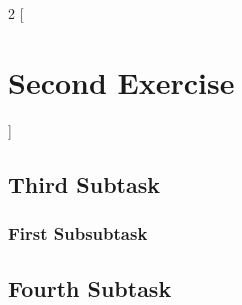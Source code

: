 \documentclass{article}
\begin{document}
\bigskip


\begin{multicols}{2}
[
\section{Second Exercise}
\blindtext
]

\subsection{Third Subtask}
\Blindtext

\subsubsection{First Subsubtask}
\blindtext\cite{Bird2014}

\subsection{Fourth Subtask}
\blindtext

\end{multicols}

\bigskip


\printbibliography

\end{document}
